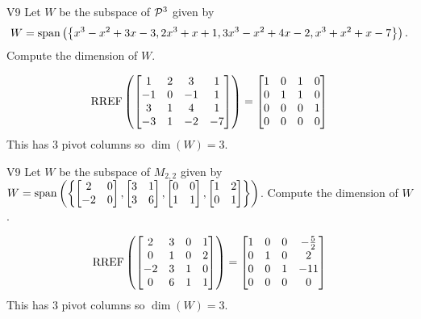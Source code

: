 \begin{problem}{V9}
Let \(W\) be the subspace of \(\P^3\) given by \[W=\vspan\left( \left\{ x^3-x^2+3x-3, 2x^3+x+1, 3x^3-x^2+4x-2, x^3+x^2+x-7\right\}\right).\]  Compute the dimension of \(W\).
\end{problem}
\begin{solution}
\[ \RREF \left( \begin{bmatrix} 1 & 2 & 3 & 1 \\ -1 & 0 & -1 & 1 \\ 3 & 1 & 4 & 1 \\ -3 & 1 & -2 & -7 \end{bmatrix} \right) =  \begin{bmatrix} 1 & 0 & 1 & 0 \\ 0 & 1 & 1 & 0 \\ 0 & 0 & 0 & 1 \\ 0 & 0 & 0 & 0\end{bmatrix}\]
This has 3 pivot columns so \(\dim(W)=3\).
\end{solution}


\begin{problem}{V9}
Let \(W\) be the subspace of \(M_{2,2}\) given by \(W=\vspan\left(\left\{\begin{bmatrix} 2 & 0 \\ -2 & 0 \end{bmatrix}, \begin{bmatrix} 3 & 1 \\ 3 & 6 \end{bmatrix}, \begin{bmatrix} 0 & 0 \\ 1 & 1 \end{bmatrix}, \begin{bmatrix}1 & 2 \\ 0 & 1 \end{bmatrix}\right\}\right)\). Compute the dimension of \(W\).
\end{problem}
\begin{solution}
\[\RREF\left( \begin{bmatrix} 2 & 3 & 0 & 1 \\ 0 & 1 & 0 & 2 \\ -2 & 3 & 1 & 0 \\ 0 & 6 & 1 & 1\end{bmatrix} \right) = \begin{bmatrix}1 & 0 & 0 & -\frac{5}{2} \\ 0 & 1 & 0 & 2 \\ 0 & 0 & 1 & -11\\ 0 & 0 & 0 & 0  \end{bmatrix}\]
This has 3 pivot columns so  \(\dim(W) =3\).
\end{solution}


